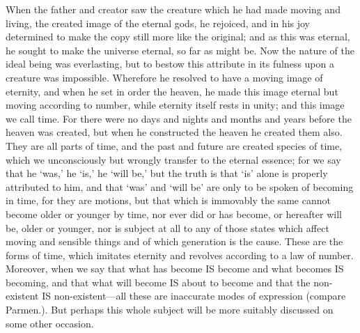 \documentclass[11pt,letter]{article}
\begin{document}
\par  When the father and creator saw the creature which he had made moving and living, the created image of the eternal gods, he rejoiced, and in his joy determined to make the copy still more like the original; and as this was eternal, he sought to make the universe eternal, so far as might be. Now the nature of the ideal being was everlasting, but to bestow this attribute in its fulness upon a creature was impossible. Wherefore he resolved to have a moving image of eternity, and when he set in order the heaven, he made this image eternal but moving according to number, while eternity itself rests in unity; and this image we call time. For there were no days and nights and months and years before the heaven was created, but when he constructed the heaven he created them also. They are all parts of time, and the past and future are created species of time, which we unconsciously but wrongly transfer to the eternal essence; for we say that he ‘was,’ he ‘is,’ he ‘will be,’ but the truth is that ‘is’ alone is properly attributed to him, and that ‘was’ and ‘will be’ are only to be spoken of becoming in time, for they are motions, but that which is immovably the same cannot become older or younger by time, nor ever did or has become, or hereafter will be, older or younger, nor is subject at all to any of those states which affect moving and sensible things and of which generation is the cause. These are the forms of time, which imitates eternity and revolves according to a law of number. Moreover, when we say that what has become IS become and what becomes IS becoming, and that what will become IS about to become and that the non-existent IS non-existent—all these are inaccurate modes of expression (compare Parmen.). But perhaps this whole subject will be more suitably discussed on some other occasion.
\end{document}
